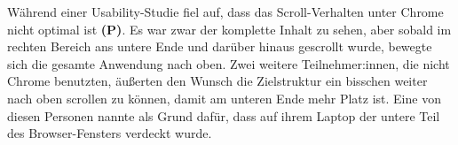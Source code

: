 \pskip
Während einer Usability-Studie fiel auf, dass das Scroll-Verhalten unter Chrome nicht optimal ist \textbf{(P)}. Es war zwar der komplette Inhalt zu sehen, aber sobald im rechten Bereich ans untere Ende und darüber hinaus gescrollt wurde, bewegte sich die gesamte Anwendung nach oben. Zwei weitere Teilnehmer:innen, die nicht Chrome benutzten, äußerten den Wunsch die Zielstruktur ein bisschen weiter nach oben scrollen zu können, damit am unteren Ende mehr Platz ist. Eine von diesen Personen nannte als Grund dafür, dass auf ihrem Laptop der untere Teil des Browser-Fensters verdeckt wurde.
